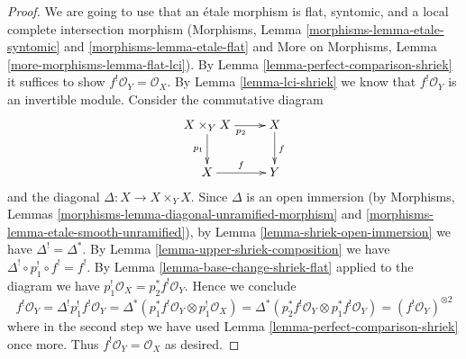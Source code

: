 \documentclass[10pt,a4paper]{amsart}
\theoremstyle{plain}
\theoremstyle{definition}
\theoremstyle{remark}
\numberwithin{equation}{subsection}
\begin{document}
\begin{proof}
We are going to use that an \'etale morphism is flat, syntomic,
and a local complete intersection morphism
(Morphisms, Lemma \ref{morphisms-lemma-etale-syntomic} and
\ref{morphisms-lemma-etale-flat} and
More on Morphisms, Lemma \ref{more-morphisms-lemma-flat-lci}).
By Lemma \ref{lemma-perfect-comparison-shriek} it suffices
to show $f^!\mathcal{O}_Y = \mathcal{O}_X$.
By Lemma \ref{lemma-lci-shriek} we know that $f^!\mathcal{O}_Y$
is an invertible module. Consider the commutative diagram
$$
\xymatrix{
X \times_Y X \ar[r]_{p_2} \ar[d]_{p_1} & X \ar[d]^f \\
X \ar[r]^f & Y
}
$$
and the diagonal $\Delta : X \to X \times_Y X$. Since $\Delta$
is an open immersion (by Morphisms, Lemmas
\ref{morphisms-lemma-diagonal-unramified-morphism} and
\ref{morphisms-lemma-etale-smooth-unramified}), by
Lemma \ref{lemma-shriek-open-immersion} we have $\Delta^! = \Delta^*$.
By Lemma \ref{lemma-upper-shriek-composition} we have
$\Delta^! \circ p_1^! \circ f^! = f^!$.
By Lemma \ref{lemma-base-change-shriek-flat} applied to
the diagram we have $p_1^!\mathcal{O}_X = p_2^*f^!\mathcal{O}_Y$.
Hence we conclude
$$
f^!\mathcal{O}_Y = \Delta^!p_1^!f^!\mathcal{O}_Y =
\Delta^*(p_1^*f^!\mathcal{O}_Y \otimes p_1^!\mathcal{O}_X) =
\Delta^*(p_2^*f^!\mathcal{O}_Y \otimes p_1^*f^!\mathcal{O}_Y) =
(f^!\mathcal{O}_Y)^{\otimes 2}
$$
where in the second step we have used
Lemma \ref{lemma-perfect-comparison-shriek} once more.
Thus $f^!\mathcal{O}_Y = \mathcal{O}_X$ as desired.
\end{proof}
\end{document}
